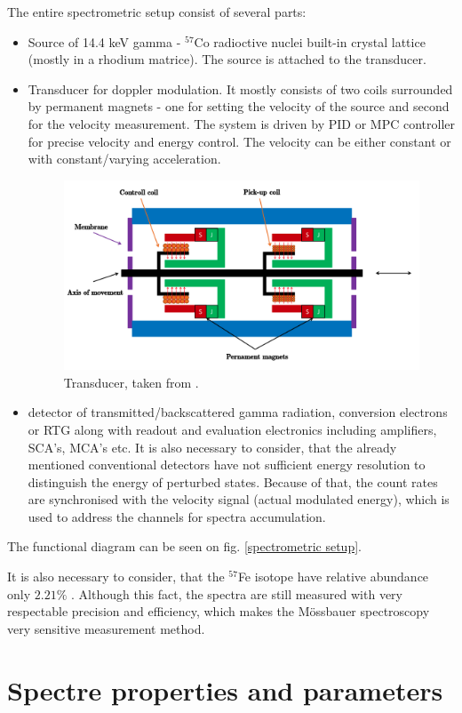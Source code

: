 The entire spectrometric setup consist of several parts:
\begin{itemize}

\item Source of 14.4 keV gamma - $^{57}$Co radioctive nuclei built-in crystal lattice (mostly in a rhodium matrice). The source is attached to the transducer.
\item Transducer for doppler modulation. It mostly consists of two coils surrounded by permanent magnets - one for setting the velocity of the source and second for the velocity measurement. The system is driven by PID or MPC controller for precise velocity and energy control. The velocity can be either constant or with constant/varying acceleration.

\begin{figure}[H]
 \centering
 \includegraphics[scale=0.4, angle = 0]{./pictures/transducer}
 \caption{Transducer, taken from \cite{STEJSKAL2019thesis}.}
 \label{transducer}
 
\end{figure}

\item detector of transmitted/backscattered gamma radiation, conversion electrons or RTG along with readout and evaluation electronics including amplifiers, SCA's, MCA's etc. It is also necessary to consider, that the already mentioned conventional detectors have not sufficient energy resolution to distinguish the energy of perturbed states. Because of that, the count rates are synchronised with the velocity signal (actual modulated energy), which is used to address the channels for spectra accumulation. 

\end{itemize}
The functional diagram can be seen on fig. \ref{spectrometric setup}.

\par
It is also necessary to consider, that the $^{57}$Fe isotope have relative abundance only $2.21 \%$ \cite{compounds}. Although this fact, the spectra are still measured with very respectable precision and efficiency, which makes the Mössbauer spectroscopy very sensitive measurement method.

\section{Spectre properties and parameters}


